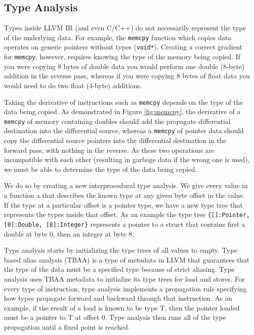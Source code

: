 \subsection{Type Analysis}

Types inside LLVM IR (and even C/C++) do not necessarily represent the type of the underlying data. For example, the \texttt{memcpy} function which copies data operates on generic pointers without types (\texttt{void*}). Creating a correct gradient for \texttt{memcpy}, however, requires knowing the type of the memory being copied. If you were copying 8 bytes of double data you would perform one double (8-byte) addition in the reverse pass, whereas if you were copying 8 bytes of float data you would need to do two float (4-byte) additions.

Taking the derivative of instructions such as \texttt{memcpy} depends on the type of the data being copied. As demonstrated in Figure \ref{fig:memcpy}, the derivative of a \texttt{memcpy} of memory containing doubles should add the propagate differential destination into the differential source, whereas a \texttt{memcpy} of pointer data should copy the differential source pointers into the differential destination in the forward pass, with nothing in the reverse. As these two operations are incompatible with each other (resulting in garbage data if the wrong one is used), we must be able to determine the type of the data being copied.

We do so by creating a new interprocedural type analysis. We give every value in a function a  that describes the known type at any given byte offset in the value. If the type at a particular offset is a pointer type, we have a new type tree that represents the types inside that offset. As an example the type tree \verb|{[]:Pointer, [0]:Double, [8]:Integer}| represents a pointer to a struct that contains first a double at byte 0, then an integer at byte 8.

Type analysis starts by initializing the type trees of all values to empty. Type based alias analysis (TBAA) is a type of metadata in LLVM that guarantees that the type of the data must be a specified type because of strict aliasing. Type analysis uses TBAA metadata to initialize its type trees for load and stores. For every type of instruction, type analysis implements a propagation rule specifying how types propagate forward and backward through that instruction. As an example, if the result of a load is known to be type T, then the pointer loaded must be a pointer to T at offset 0. Type analysis then runs all of the type propagation until a fixed point is reached.

